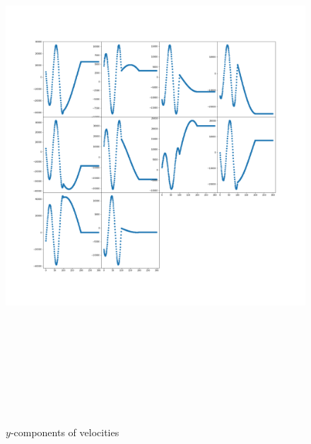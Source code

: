 \documentclass[12pt]{article}
\begin{document}
	\begin{figure}[H]
		\includegraphics[width=\linewidth, height=20cm]{subvsy3.png} \caption{$y$-components of velocities} \label{subvsy3}
	\end{figure}
\end{document}
